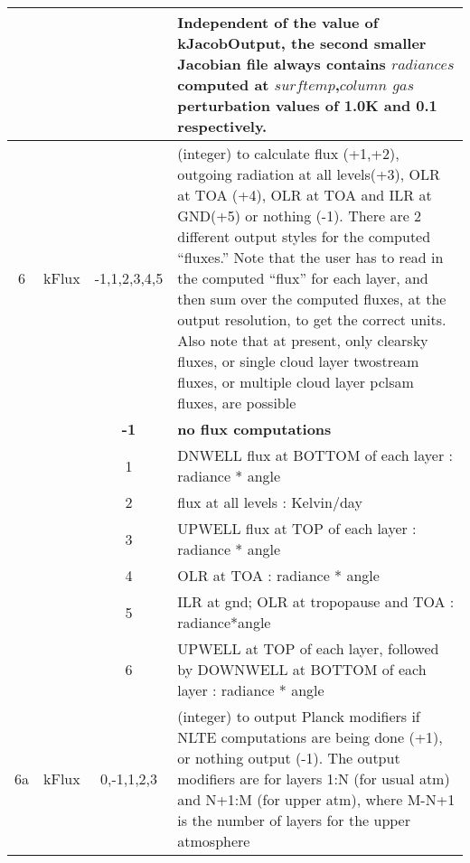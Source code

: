 \documentclass[12pt]{article}
\newlength{\colwidth}
\newlength{\colwidthshort}
\begin{document}
\begin{small}
\begin{longtable}{|c|c|c|p{\colwidthshort}|}
   & & & Independent of the value of kJacobOutput, the second smaller Jacobian
         file always contains $radiances$ computed at $surftemp$,$column$ $gas$
         perturbation values of 1.0K and 0.1 respectively.\\
  \hline
6 & {\sf kFlux}   & -1,1,2,3,4,5 & (integer) to calculate flux (+1,+2), 
    outgoing radiation at all levels(+3), OLR at TOA (+4), OLR at TOA and
    ILR at GND(+5) or nothing (-1). There are 2 different output styles for 
    the computed ``fluxes.'' Note that the user has to read in the computed 
   ``flux'' for each layer, and then sum over the computed fluxes, at the 
    output resolution, to get the correct units. Also note that at present, 
    only clearsky fluxes, or single cloud layer twostream fluxes, or multiple 
    cloud layer pclsam fluxes, are possible\\
   &  & {\bf -1}  & {\bf no flux computations} \\
   &             & 1 & DNWELL flux at BOTTOM of each layer : radiance * angle\\
   &             & 2 & flux at all levels : Kelvin/day\\ 
   &             & 3 & UPWELL flux at TOP of each layer : radiance * angle\\
   &             & 4 & OLR  at TOA : radiance * angle\\
   &             & 5 & ILR at gnd; OLR at tropopause and TOA : radiance*angle\\
   &             & 6 & UPWELL at TOP of each layer, followed by DOWNWELL at BOTTOM of each layer : radiance * angle\\
\hline
6a & {\sf kFlux}   & 0,-1,1,2,3 & (integer) to output Planck modifiers if NLTE 
computations are being done (+1), or nothing output (-1). The output modifiers are
for layers 1:N (for usual atm) and N+1:M (for upper atm), where M-N+1 is the number of
layers for the upper atmosphere\\
   

\end{longtable}
\end{small}
\end{document}
